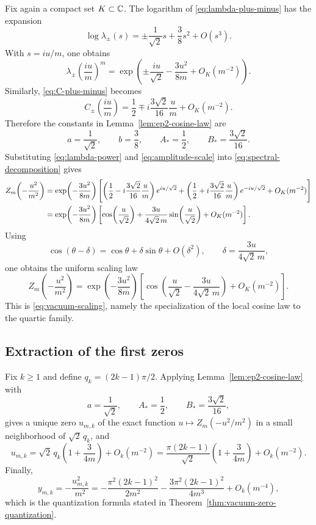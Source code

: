 Fix again a compact set $K\subset\mathbb{C}$.
The logarithm of \eqref{eq:lambda-plus-minus} has the expansion
\begin{equation}\label{eq:log-lambda-plus-minus}
\log \lambda_\pm(s)
=
\pm \frac{1}{\sqrt2}s+\frac38 s^2+O(s^3).
\end{equation}
With $s=iu/m$, one obtains
\begin{equation}\label{eq:lambda-power}
\lambda_\pm\!\left(\frac{iu}{m}\right)^m
=
\exp\!\left(
\pm \frac{iu}{\sqrt2}-\frac{3u^2}{8m}+O_K(m^{-2})
\right).
\end{equation}
Similarly, \eqref{eq:C-plus-minus} becomes
\begin{equation}\label{eq:amplitude-scale}
C_\pm\!\left(\frac{iu}{m}\right)
=
\frac12\mp i\frac{3\sqrt2}{16}\frac{u}{m}+O_K(m^{-2}).
\end{equation}
Therefore the constants in Lemma~\ref{lem:ep2-cosine-law} are
\[
a=\frac{1}{\sqrt2},
\qquad
b=\frac38,
\qquad
A_*=\frac12,
\qquad
B_*=\frac{3\sqrt2}{16}.
\]
Substituting \eqref{eq:lambda-power} and \eqref{eq:amplitude-scale} into \eqref{eq:spectral-decomposition} gives
\begin{align}
Z_m\!\left(-\frac{u^2}{m^2}\right)
&=
\exp\!\left(-\frac{3u^2}{8m}\right)
\Biggl[
\left(\frac12-i\frac{3\sqrt2}{16}\frac{u}{m}\right)e^{iu/\sqrt2}
+\left(\frac12+i\frac{3\sqrt2}{16}\frac{u}{m}\right)e^{-iu/\sqrt2}
+O_K(m^{-2})
\Biggr] \notag\\
&=
\exp\!\left(-\frac{3u^2}{8m}\right)
\left[
\cos\!\left(\frac{u}{\sqrt2}\right)
+\frac{3u}{4\sqrt2\,m}\sin\!\left(\frac{u}{\sqrt2}\right)
+O_K(m^{-2})
\right].\label{eq:appendix-scaling}
\end{align}
Using
\[
\cos(\theta-\delta)=\cos\theta+\delta\sin\theta+O(\delta^2),
\qquad
\delta=\frac{3u}{4\sqrt2\,m},
\]
one obtains the uniform scaling law
\begin{equation}\label{eq:appendix-shifted-cosine}
Z_m\!\left(-\frac{u^2}{m^2}\right)
=
\exp\!\left(-\frac{3u^2}{8m}\right)
\left[
\cos\!\left(\frac{u}{\sqrt2}-\frac{3u}{4\sqrt2\,m}\right)
+ O_K(m^{-2})
\right].
\end{equation}
This is \eqref{eq:vacuum-scaling}, namely the specialization of the local cosine law to the quartic family.

\subsection{Extraction of the first zeros}

Fix $k\ge1$ and define $q_k=(2k-1)\pi/2$.
Applying Lemma~\ref{lem:ep2-cosine-law} with
\[
a=\frac{1}{\sqrt2},
\qquad
A_*=\frac12,
\qquad
B_*=\frac{3\sqrt2}{16},
\]
gives a unique zero $u_{m,k}$ of the exact function $u\mapsto Z_m(-u^2/m^2)$ in a small neighborhood of \(\sqrt2\,q_k\), and
\[
u_{m,k}
=
\sqrt2\,q_k\left(1+\frac{3}{4m}\right)+O_k(m^{-2})
=
\frac{\pi(2k-1)}{\sqrt2}\left(1+\frac{3}{4m}\right)+O_k(m^{-2}).
\]
Finally,
\[
y_{m,k}=-\frac{u_{m,k}^2}{m^2}
=
-\frac{\pi^2(2k-1)^2}{2m^2}
-\frac{3\pi^2(2k-1)^2}{4m^3}
+O_k(m^{-4}),
\]
which is the quantization formula stated in Theorem~\ref{thm:vacuum-zero-quantization}.
